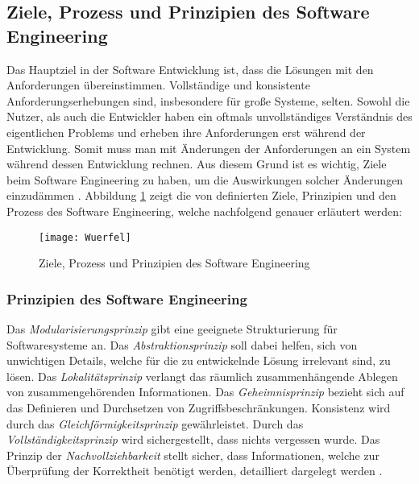 \subsection{Ziele, Prozess und Prinzipien des Software Engineering}

Das Hauptziel in der Software Entwicklung ist, dass die Lösungen mit den Anforderungen übereinstimmen. Vollständige und konsistente Anforderungserhebungen sind, insbesondere für große Systeme, selten. Sowohl die Nutzer, als auch die Entwickler haben ein oftmals unvollständiges Verständnis des eigentlichen Problems und erheben ihre Anforderungen erst während der Entwicklung. Somit muss man mit Änderungen der Anforderungen an ein System während dessen Entwicklung rechnen. Aus diesem Grund ist es wichtig, Ziele beim Software Engineering zu haben, um die Auswirkungen solcher Änderungen einzudämmen \cite{Booch1993}.
Abbildung  \ref{fig:Wuerfel} zeigt die von \cite{ross1975software} definierten Ziele, Prinzipien und den Prozess des Software Engineering, welche nachfolgend genauer erläutert werden: 

\begin{figure}[htp]
\begin{center}
  \texttt{[image: Wuerfel]} %
  \caption{Ziele, Prozess und Prinzipien des Software Engineering  \cite{ross1975software}}
  \label{fig:Wuerfel}
\end{center}
\end{figure}

\subsubsection{Prinzipien des Software Engineering}


 Das \textit{Modularisierungsprinzip} gibt eine geeignete Strukturierung für Softwaresysteme an. Das \textit{Abstraktionsprinzip} soll dabei helfen, sich von unwichtigen Details, welche für die zu entwickelnde Lösung irrelevant sind, zu lösen. Das \textit{Lokalitätsprinzip} verlangt das räumlich zusammenhängende Ablegen von zusammengehörenden Informationen. Das \textit{Geheimnisprinzip} bezieht sich auf das Definieren und Durchsetzen von Zugriffsbeschränkungen. Konsistenz wird durch das \textit{Gleichförmigkeitsprinzip} gewährleistet. Durch das \textit{Vollständigkeitsprinzip} wird sichergestellt, dass nichts vergessen wurde. Das Prinzip der \textit{Nachvollziehbarkeit} stellt sicher, dass Informationen, welche zur Überprüfung der Korrektheit benötigt werden, detailliert dargelegt werden \cite{ross1975software}.
 
